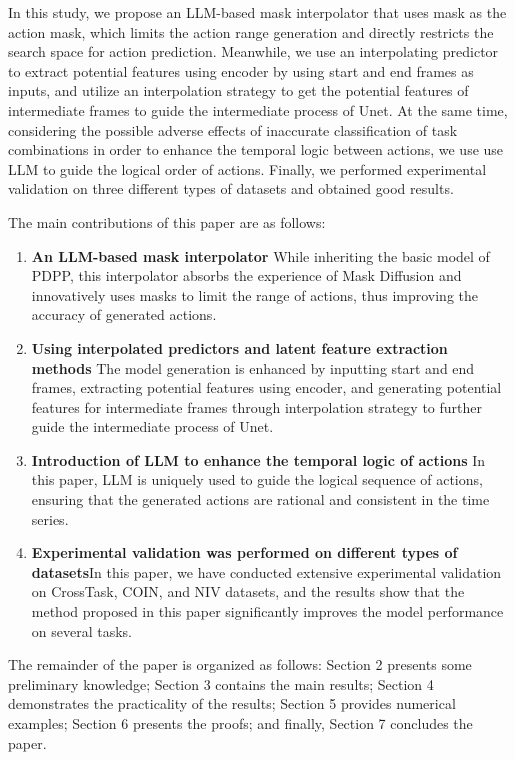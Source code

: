 \documentclass{article} %
\begin{document}
In this study, we propose an LLM-based mask interpolator that uses mask as the action mask, which limits the action range generation and directly restricts the search space for action prediction. Meanwhile, we use an interpolating predictor to extract potential features using encoder by using start and end frames as inputs, and utilize an interpolation strategy to get the potential features of intermediate frames to guide the intermediate process of Unet. At the same time, considering the possible adverse effects of inaccurate classification of task combinations in order to enhance the temporal logic between actions, we use use LLM to guide the logical order of actions. Finally, we performed experimental validation on three different types of datasets and obtained good results.

The main contributions of this paper are as follows:
\begin{enumerate}
     \item \textbf{An LLM-based mask interpolator} While inheriting the basic model of PDPP, this interpolator absorbs the experience of Mask Diffusion and innovatively uses masks to limit the range of actions, thus improving the accuracy of generated actions.

     \item \textbf{Using interpolated predictors and latent feature extraction methods} The model generation is enhanced by inputting start and end frames, extracting potential features using encoder, and generating potential features for intermediate frames through interpolation strategy to further guide the intermediate process of Unet.

     \item \textbf{Introduction of LLM to enhance the temporal logic of actions} In this paper, LLM is uniquely used to guide the logical sequence of actions, ensuring that the generated actions are rational and consistent in the time series.
     \item \textbf{Experimental validation was performed on different types of datasets}In this paper, we have conducted extensive experimental validation on CrossTask, COIN, and NIV datasets, and the results show that the method proposed in this paper significantly improves the model performance on several tasks.
\end{enumerate}

The remainder of the paper is organized as follows: Section 2 presents some preliminary knowledge; Section 3 contains the main results; Section 4 demonstrates the practicality of the results; Section 5 provides numerical examples; Section 6 presents the proofs; and finally, Section 7 concludes the paper.
\end{document}
